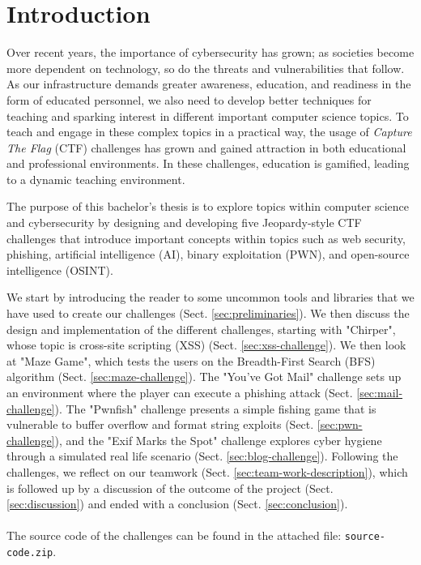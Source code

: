 \section{Introduction}\label{sec:introduction}

Over recent years, the importance of cybersecurity has grown; as societies become more dependent on technology, so do the threats and vulnerabilities that follow. As our infrastructure demands greater awareness, education, and readiness in the form of educated personnel, we also need to develop better techniques for teaching and sparking interest in different important computer science topics. To teach and engage in these complex topics in a practical way, the usage of \textit{Capture The Flag} (CTF)\cite{ctf_overview} challenges has grown and gained attraction in both educational and professional environments. In these challenges, education is gamified, leading to a dynamic teaching environment.

The purpose of this bachelor's thesis is to explore topics within computer science and cybersecurity by designing and developing five Jeopardy-style CTF challenges that introduce important concepts within topics such as web security, phishing, artificial intelligence (AI), binary exploitation (PWN), and open-source intelligence (OSINT).

We start by introducing the reader to some uncommon tools and libraries that we have used to create our challenges (Sect. \ref{sec:preliminaries}). We then discuss the design and implementation of the different challenges, starting with "Chirper", whose topic is cross-site scripting (XSS) (Sect. \ref{sec:xss-challenge}). We then look at "Maze Game", which tests the users on the Breadth-First Search (BFS) algorithm (Sect. \ref{sec:maze-challenge}). The "You've Got Mail" challenge sets up an environment where the player can execute a phishing attack (Sect. \ref{sec:mail-challenge}). The "Pwnfish" challenge presents a simple fishing game that is vulnerable to buffer overflow and format string exploits (Sect. \ref{sec:pwn-challenge}), and the "Exif Marks the Spot" challenge explores cyber hygiene through a simulated real life scenario (Sect. \ref{sec:blog-challenge}). Following the challenges, we reflect on our teamwork (Sect. \ref{sec:team-work-description}), which is followed up by a discussion of the outcome of the project (Sect. \ref{sec:discussion}) and ended with a conclusion (Sect. \ref{sec:conclusion}).
\\ \\
The source code of the challenges can be found in the attached file: \texttt{source-code.zip}.
